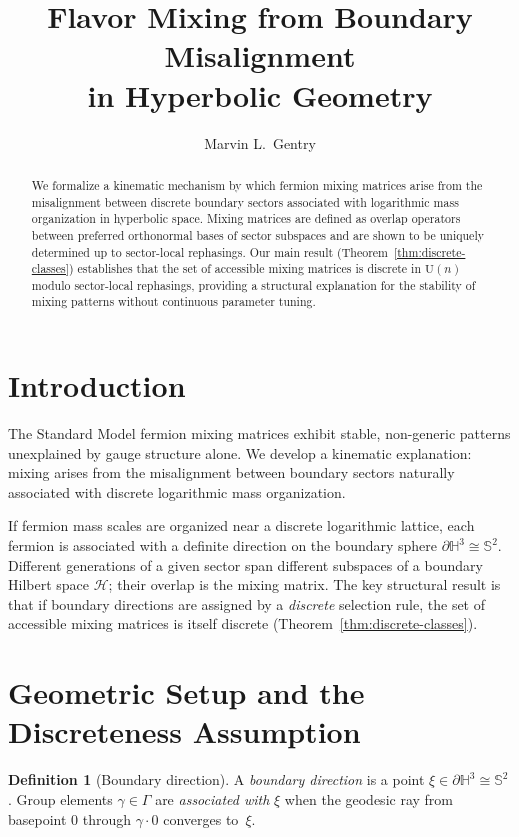 ﻿\documentclass[12pt]{article}
\title{Flavor Mixing from Boundary Misalignment\\in Hyperbolic Geometry}
\author{Marvin L.\ Gentry}
\date{}
\theoremstyle{definition}
\newtheorem{definition}[theorem]{Definition}
\theoremstyle{remark}
\newcommand{\Sphere}{\mathbb{S}^2}
\newcommand{\GammaG}{\Gamma}
\newcommand{\U}{\mathrm{U}}
\newcommand{\calH}{\mathcal{H}}
\newcommand{\bdry}{\partial\mathbb{H}^3}
\begin{document}
\maketitle

\begin{abstract}
We formalize a kinematic mechanism by which fermion mixing matrices arise
from the misalignment between discrete boundary sectors associated with
logarithmic mass organization in hyperbolic space. Mixing matrices are
defined as overlap operators between preferred orthonormal bases of sector
subspaces and are shown to be uniquely determined up to sector-local
rephasings. Our main result (Theorem~\ref{thm:discrete-classes}) establishes
that the set of accessible mixing matrices is discrete in $\U(n)$ modulo
sector-local rephasings, providing a structural explanation for the
stability of mixing patterns without continuous parameter tuning.
\end{abstract}

\section{Introduction}

The Standard Model fermion mixing matrices exhibit stable, non-generic
patterns unexplained by gauge structure alone. We develop a kinematic
explanation: mixing arises from the misalignment between boundary sectors
naturally associated with discrete logarithmic mass organization.

If fermion mass scales are organized near a discrete logarithmic lattice,
each fermion is associated with a definite direction on the boundary sphere
$\bdry\cong\Sphere$. Different generations of a given sector span different
subspaces of a boundary Hilbert space $\calH$; their overlap is the mixing
matrix. The key structural result is that if boundary directions are assigned
by a \emph{discrete} selection rule, the set of accessible mixing matrices
is itself discrete (Theorem~\ref{thm:discrete-classes}).

\section{Geometric Setup and the Discreteness Assumption}

\begin{definition}[Boundary direction]\label{def:bdrydir}
A \emph{boundary direction} is a point $\xi\in\bdry\cong\Sphere$.
Group elements $\gamma\in\GammaG$ are \emph{associated with} $\xi$ when
the geodesic ray from basepoint $0$ through $\gamma\cdot0$ converges to~$\xi$.
\end{definition}
\end{document}

